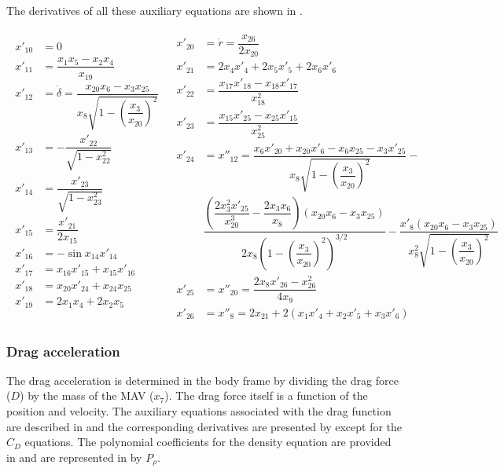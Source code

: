 The derivatives of all these auxiliary equations are shown in .

 \begin{align} \label{eq:derTransAnglAux}
\begin{split}
x'_{10} &= 0 \\
x'_{11} &=  \dfrac{x_{1}x_{5}-x_{2}x_{4}}{x_{19}}\\
x'_{12} &= \dot{\delta} = \dfrac{x_{20}x_{6}-x_{3}x_{25}}{x_{8} \sqrt{1-\left(\dfrac{x_{3}}{x_{20}}\right)^{2}}}\\
x'_{13} &= -\dfrac{x'_{22}}{\sqrt{1-x_{22}^{2}}}\\
x'_{14} &= \dfrac{x'_{23}}{\sqrt{1-x_{23}^{2}}}\\
x'_{15} &= \dfrac{x'_{21}}{2 x_{15}}\\
x'_{16} &= -\sin x_{14}x'_{14}\\
x'_{17} &= x_{16}x'_{15}+x_{15}x'_{16}\\
x'_{18} &= x_{20}x'_{24}+x_{24}x_{25}\\
x'_{19} &= 2x_{1}x_{4}+2x_{2}x_{5}\\
\end{split}
&
\begin{split}
x'_{20} &= \dot{r} = \dfrac{x_{26}}{2 x_{20}}\\
x'_{21} &= 2x_{4}x'_{4}+2x_{5}x'_{5}+2x_{6}x'_{6}\\
x'_{22} &= \dfrac{x_{17}x'_{18}-x_{18}x'_{17}}{x_{18}^{2}}\\
x'_{23} &= \dfrac{x_{15}x'_{25}-x_{25}x'_{15}}{x_{25}^{2}}\\
x'_{24} &= x''_{12} = \dfrac{x_{6}x'_{20}+x_{20}x'_{6}-x_{6}x_{25}-x_{3}x'_{25}}{x_{8}\sqrt{1-\left(\dfrac{x_{3}}{x_{20}}\right)^{2}}}-\\
&\dfrac{\left(\dfrac{2x_{3}^{2}x'_{25}}{x_{20}^{3}}-\dfrac{2x_{3}x_{6}}{x_{8}}\right)\left(x_{20}x_{6}-x_{3}x_{25}\right)}{2x_{8}\left(1-\left(\dfrac{x_{3}}{x_{20}}\right)^{2}\right)^{3/2}}-\dfrac{x'_{8}\left(x_{20}x_{6}-x_{3}x_{25}\right)}{x_{8}^{2}\sqrt{1-\left(\dfrac{x_{3}}{x_{20}}\right)^{2}}}\\
x'_{25} &= x''_{20} = \dfrac{2x_{8}x'_{26}-x_{26}^{2}}{4x_{9}}\\
x'_{26} &= x''_{8} = 2x_{21}+2\left(x_{1}x'_{4}+x_{2}x'_{5}+x_{3}x'_{6}\right)
\end{split}
\end{align}

 \subsubsection{Drag acceleration}
 \label{subsubsec:tsiDrag}
The drag acceleration is determined in the body frame by dividing the drag force ($D$) by the mass of the \ac{MAV} ($x_{7}$). The drag force itself is a function of the position and velocity. The auxiliary equations associated with the drag function are described in  and the corresponding derivatives are presented by  except for the $C_{D}$ equations. The polynomial coefficients for the density equation are provided in  and are represented in  by $P_{\rho}$.

